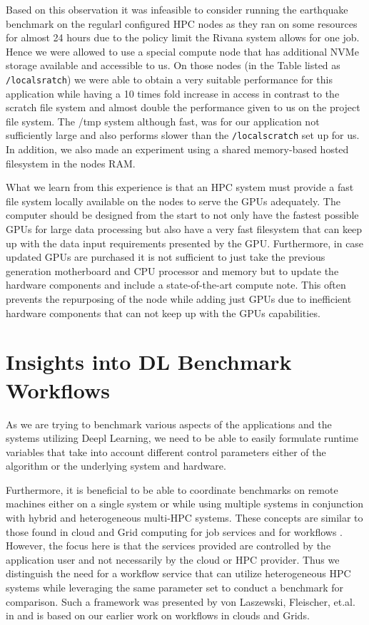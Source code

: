 \documentclass[utf8]{FrontiersinVancouver} %
\begin{document}
  Based on this observation it was infeasible to consider running the
  earthquake benchmark on the regularl configured HPC nodes as they
  ran on some resources for almost 24 hours due to the policy limit
  the Rivana system allows for one job. Hence we were allowed to use a
  special compute node that has additional NVMe storage available and
  accessible to us. On those nodes (in the Table listed as
  \verb|/localsratch|) we were able to obtain a very suitable
  performance for this application while having a 10 times fold
  increase in access in contrast to the scratch file system and almost
  double the performance given to us on the project file system. The
  /tmp system although fast, was for our application not sufficiently
  large and also performs slower than the \verb|/localscratch| set up
  for us. In addition, we also made an experiment using a shared
  memory-based hosted filesystem in the nodes RAM.

  What we learn from this experience is that an HPC system must
  provide a fast file system locally available on the nodes to serve
  the GPUs adequately. The computer should be designed from the start
  to not only have the fastest possible GPUs for large data processing
  but also have a very fast filesystem that can keep up with the data
  input requirements presented by the GPU. Furthermore, in case
  updated GPUs are purchased it is not sufficient to just take the
  previous generation motherboard and CPU processor and memory but to
  update the hardware components and include a state-of-the-art
  compute note. This often prevents the repurposing of the node while
  adding just GPUs due to inefficient hardware components that can not
  keep up with the GPUs capabilities.

  


\section{Insights into DL Benchmark Workflows}
\label{sec:workflow-main}

As we are trying to benchmark various aspects of the applications and
the systems utilizing Deepl Learning, we need to be able to easily
formulate runtime variables that take into account different control
parameters either of the algorithm or the underlying system and
hardware.

Furthermore, it is beneficial to be able to coordinate benchmarks on
remote machines either on a single system or while using multiple
systems in conjunction with hybrid and heterogeneous multi-HPC
systems. These concepts are similar to those found in cloud and Grid
computing for job services \citep{las-infogram} and for workflows
\citep{las-workflow,las07-workflow}. However, the focus here is that
the services provided are controlled by the application user and not
necessarily by the cloud or HPC provider. Thus we distinguish the need
for a workflow service that can utilize heterogeneous HPC systems
while leveraging the same parameter set to conduct a benchmark for
comparison. Such a framework was presented by von Laszewski, Fleischer,
et.al. in \citep{las-22-arxiv-workflow-cc} and is based on our earlier
work on workflows in clouds and Grids.
\end{document}
